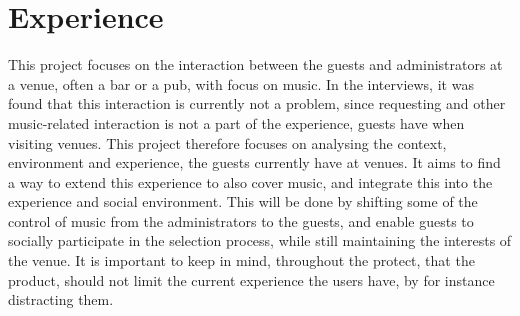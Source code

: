 \section{Experience}
This project focuses on the interaction between the guests and administrators at a venue, often a bar or a pub, with focus on music.
In the interviews, it was found that this interaction is currently not a problem, since requesting and other music-related interaction is not a part of the experience, guests have when visiting venues. This project therefore focuses on analysing the context, environment and experience, the guests currently have at venues. It aims to find a way to extend this experience to also cover music, and integrate this into the experience and social environment. This will be done by shifting some of the control of music from the administrators to the guests, and enable guests to socially participate in the selection process, while still maintaining the interests of the venue. It is important to keep in mind, throughout the protect, that the product, should not limit the current experience the users have, by for instance distracting them.
